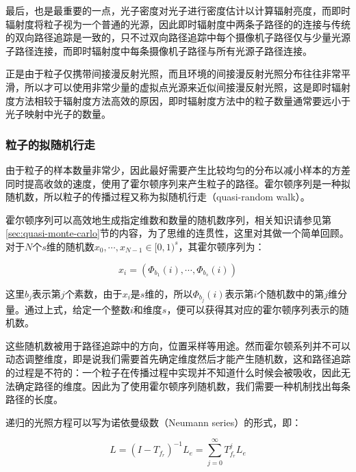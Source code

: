 最后，也是最重要的一点，光子密度对光子进行密度估计以计算辐射亮度，而即时辐射度将粒子视为一个普通的光源，因此即时辐射度中两条子路径的的连接与传统的双向路径追踪是一致的，只不过双向路径追踪中每个摄像机子路径仅与少量光源子路径连接，而即时辐射度中每条摄像机子路径与所有光源子路径连接。

正是由于粒子仅携带间接漫反射光照，而且环境的间接漫反射光照分布往往非常平滑，所以才可以使用非常少量的虚拟点光源来近似间接漫反射光照，这是即时辐射度方法相较于辐射度方法高效的原因，即时辐射度方法中的粒子数量通常要远小于光子映射中光子的数量。




\subsubsection{粒子的拟随机行走}
由于粒子的样本数量非常少，因此最好需要产生比较均匀的分布以减小样本的方差同时提高收敛的速度，\cite{a:InstantRadiosity}使用了霍尔顿序列来产生粒子的路径。霍尔顿序列是一种拟随机数，所以粒子的传播过程又称为拟随机行走（quasi-random walk）\cite{a:Quasi-MonteCarloRadiosity}。

霍尔顿序列可以高效地生成指定维数和数量的随机数序列，相关知识请参见第\ref{sec:quasi-monte-carlo}节的内容，为了思维的连贯性，这里对其做一个简单回顾。对于$N$个$s$维的随机数$x_0,\cdots,x_{N-1}\in [0,1)^{s}$，其霍尔顿序列为：

\begin{equation}\label{e:ir-halton-sequence}
	x_i=(\Phi_{b_1}(i),\cdots,\Phi_{b_s}(i))
\end{equation}

\noindent 这里$b_j$表示第$j$个素数，由于$x_i$是$s$维的，所以$\Phi_{b_j}(i)$表示第$i$个随机数中的第$j$维分量。通过上式，给定一个整数$i$和维度$s$，便可以获得其对应的霍尔顿序列表示的随机数。

这些随机数被用于路径追踪中的方向，位置采样等用途。然而霍尔顿系列并不可以动态调整维度，即是说我们需要首先确定维度然后才能产生随机数，这和路径追踪的过程是不符的：一个粒子在传播过程中实现并不知道什么时候会被吸收，因此无法确定路径的维度。因此为了使用霍尔顿序列随机数，我们需要一种机制找出每条路径的长度。

递归的光照方程可以写为诺依曼级数（Neumann series）的形式，即：

\begin{equation}\label{e:ir-transport-operator}
	L=(I-T_{f_r})^{-1}L_e=\sum^{\infty}_{j=0}T^{j}_{f_r}L_e
\end{equation}

